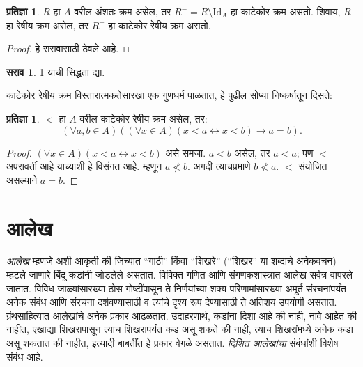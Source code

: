 \documentclass[11pt,a4paper,openany]{book}
\theoremstyle{definition}
\newtheorem{prop}[defn]{प्रतिज्ञा}
\newtheorem{prob}{सराव}[chapter]
\newcommand{\lif}{\mathbin{\to}}
\newcommand{\Id}[1]{\mathord{\mathrm{Id}_{#1}}}
\newcommand{\liff}{\mathbin{\leftrightarrow}}
\begin{document}
\begin{prop}\label{sfr:rel:ord:prop:partialtostrict}
$R$ हा $A$ वरील अंशतः क्रम असेल, तर $R^- = R \setminus \Id{A}$ हा
काटेकोर क्रम असतो. शिवाय, $R$ हा रेषीय क्रम असेल, तर $R^-$ हा काटेकोर
रेषीय क्रम असतो.
\end{prop}

\begin{proof}
हे सरावासाठी ठेवले आहे.
\end{proof}

\begin{prob}
\ref{sfr:rel:ord:prop:partialtostrict} याची सिद्धता द्या.
\end{prob}

काटेकोर रेषीय क्रम विस्तारात्मकतेसारखा एक गुणधर्म पाळतात, हे पुढील
सोप्या निष्कर्षातून दिसते:

\begin{prop}\label{sfr:rel:ord:prop:extensionality-strictlinearorders}
$<$ हा $A$ वरील काटेकोर रेषीय क्रम असेल, तर:
\[
  (\forall a, b \in A)((\forall x \in A)(x < a \liff x < b) \lif a = b).
\]
\end{prop}

\begin{proof}
$(\forall x \in A)(x < a \liff x < b)$ असे समजा. $a < b$ असेल, तर
$a < a$; पण $<$ अपरावर्ती आहे याच्याशी हे विसंगत आहे. म्हणून $a \nless b$.
अगदी त्याचप्रमाणे $b \nless a$. $<$ संयोजित असल्याने $a = b$.
\end{proof}











\section{आलेख}\label{sfr:rel:grp:sec}

\emph{आलेख} म्हणजे अशी आकृती की जिच्यात ``गाठी'' किंवा ``शिखरे''
(``शिखर'' या शब्दाचे अनेकवचन) म्हटले जाणारे बिंदू कडांनी जोडलेले असतात. विविक्त गणित आणि संगणकशास्त्रात
आलेख सर्वत्र वापरले जातात. विविध जाळ्यांसारख्या ठोस गोष्टींपासून ते
निर्णयांच्या शक्य परिणामांसारख्या अमूर्त संरचनांपर्यंत अनेक संबंध आणि
संरचना दर्शवण्यासाठी व त्यांचे दृश्य रूप देण्यासाठी ते अतिशय उपयोगी
असतात. ग्रंथसाहित्यात आलेखांचे अनेक प्रकार आढळतात. उदाहरणार्थ, कडांना
दिशा आहे की नाही, नावे आहेत की नाहीत, एखाद्या शिखरापासून त्याच शिखरापर्यंत
कड असू शकते की नाही, त्याच शिखरांमध्ये अनेक कडा असू शकतात की नाहीत,
इत्यादी बाबतींत हे प्रकार वेगळे असतात. \emph{दिशित आलेखांचा} संबंधांशी
विशेष संबंध आहे.
\end{document}
